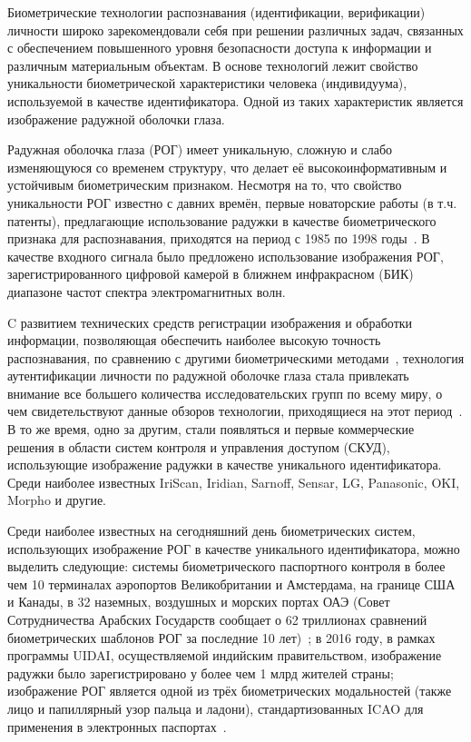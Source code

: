 \intro

%
%

Биометрические технологии распознавания (идентификации, верификации) личности широко зарекомендовали себя при решении различных задач, связанных с обеспечением повышенного уровня безопасности доступа к информации и различным материальным объектам. В основе технологий лежит свойство уникальности биометрической характеристики человека (индивидуума), используемой в качестве идентификатора. Одной из таких характеристик является изображение радужной оболочки глаза.

Радужная оболочка глаза (РОГ) имеет уникальную, сложную и слабо изменяющуюся со временем структуру, что делает её высокоинформативным и устойчивым биометрическим признаком. Несмотря на то, что свойство уникальности РОГ известно с давних времён, первые новаторские работы (в т.ч. патенты), предлагающие использование радужки в качестве биометрического признака для распознавания, приходятся на период с 1985 по 1998 годы~\cite{flom_safir_patent_1985,daugman_1992,daugman_1993,wildes_1997,wildes_patent_1998,boles_1998}. В качестве входного сигнала было предложено использование изображения РОГ, зарегистрированного цифровой камерой в ближнем инфракрасном (БИК) диапазоне частот спектра электромагнитных волн.

C развитием технических средств регистрации изображения и обработки информации, позволяющая обеспечить наиболее высокую точность распознавания, по сравнению с другими биометрическими методами~\cite{mbgc_2007,mbe_2009,mbc_nist_2010}, технология аутентификации личности по радужной оболочке глаза стала привлекать внимание все большего количества исследовательских групп по всему миру, о чем свидетельствуют данные обзоров технологии, приходящиеся на этот период~\cite{bowyer_survey_2008,ng_overview_2008,labati_overview_2012,bowyer_handbook_2012}. В то же время, одно за другим, стали появляться и первые коммерческие решения в области систем контроля и управления доступом (СКУД), использующие изображение радужки в качестве уникального идентификатора. Среди наиболее известных IriScan, Iridian, Sarnoff, Sensar, LG, Panasonic, OKI, Morpho и другие.

Среди наиболее известных на сегодняшний день биометрических систем, использующих изображение РОГ в качестве уникального идентификатора, можно выделить следующие: системы биометрического паспортного контроля в более чем 10 терминалах аэропортов Великобритании и Амстердама, на границе США и Канады, в 32 наземных, воздушных и морских портах ОАЭ (Совет Сотрудничества Арабских Государств сообщает о 62 триллионах сравнений биометрических шаблонов РОГ за последние 10 лет)~\cite{iris_wiki}; в 2016 году, в рамках программы UIDAI, осуществляемой индийским правительством, изображение радужки было зарегистрировано у более чем 1 млрд жителей страны; изображение РОГ является одной из трёх биометрических модальностей (также лицо и папиллярный узор пальца и ладони), стандартизованных ICAO для применения в электронных паспортах~\cite{icao_2015}.

